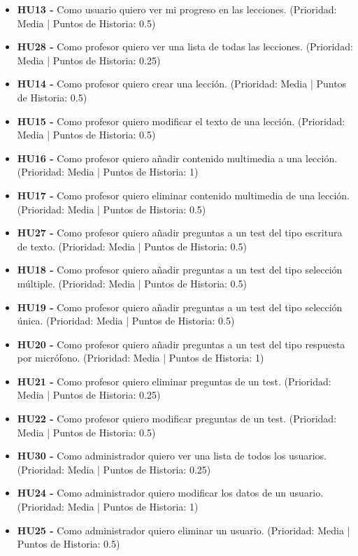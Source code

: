 \begin{itemize}
    \item \textbf{HU13 - } Como usuario quiero ver mi progreso en las lecciones. (Prioridad: Media | Puntos de Historia: 0.5)
    \item \textbf{HU28 - } Como profesor quiero ver una lista de todas las lecciones. (Prioridad: Media | Puntos de Historia: 0.25)
    \item \textbf{HU14 - } Como profesor quiero crear una lección. (Prioridad: Media | Puntos de Historia: 0.5)
    \item \textbf{HU15 - } Como profesor quiero modificar el texto de una lección. (Prioridad: Media | Puntos de Historia: 0.5)
    \item \textbf{HU16 - } Como profesor quiero añadir contenido multimedia a una lección. (Prioridad: Media | Puntos de Historia: 1)
    \item \textbf{HU17 - } Como profesor quiero eliminar contenido multimedia de una lección. (Prioridad: Media | Puntos de Historia: 0.5)
    \item \textbf{HU27 - } Como profesor quiero añadir preguntas a un test del tipo escritura de texto. (Prioridad: Media | Puntos de Historia: 0.5)
    \item \textbf{HU18 - } Como profesor quiero añadir preguntas a un test del tipo selección múltiple. (Prioridad: Media | Puntos de Historia: 0.5)
    \item \textbf{HU19 - } Como profesor quiero añadir preguntas a un test del tipo selección única. (Prioridad: Media | Puntos de Historia: 0.5)
    \item \textbf{HU20 - } Como profesor quiero añadir preguntas a un test del tipo respuesta por micrófono. (Prioridad: Media | Puntos de Historia: 1)
    \item \textbf{HU21 - } Como profesor quiero eliminar preguntas de un test. (Prioridad: Media | Puntos de Historia: 0.25)
    \item \textbf{HU22 - } Como profesor quiero modificar preguntas de un test. (Prioridad: Media | Puntos de Historia: 0.5)
    \item \textbf{HU30 - } Como administrador quiero ver una lista de todos los usuarios. (Prioridad: Media | Puntos de Historia: 0.25)
    \item \textbf{HU24 - } Como administrador quiero modificar los datos de un usuario. (Prioridad: Media | Puntos de Historia: 1)
    \item \textbf{HU25 - } Como administrador quiero eliminar un usuario. (Prioridad: Media | Puntos de Historia: 0.5)

\end{itemize}
